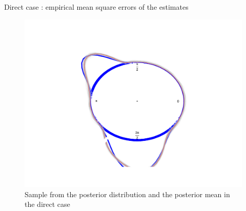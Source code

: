 \documentclass[10pt]{beamer}
\begin{document}
\begin{frame}{Direct case : empirical mean square errors of the estimates}
\begin{figure}
\centering
 \includegraphics[width=.75\linewidth]{directsamp.pdf}
\caption{Sample from the posterior distribution and the posterior mean in the direct case}\label{M}
\end{figure}
\end{frame}
%
%
%
\end{document}
